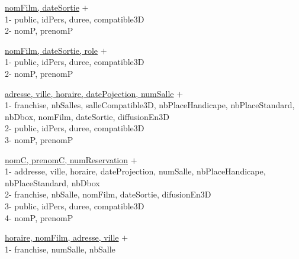 \documentclass[a4paper,sffamily,12pt]{article}
\begin{document}
\underline{nomFilm, dateSortie} $+$ \\
1- public, idPers, duree, compatible3D\\
2- nomP, prenomP\\

\vspace{0.5cm}

\underline{nomFilm, dateSortie, role} $+$ \\
1- public, idPers, duree, compatible3D\\
2- nomP, prenomP\\

\vspace{0.5cm}

\underline{adresse, ville, horaire, datePojection, numSalle} $+$ \\
1- franchise, nbSalles, salleCompatible3D, nbPlaceHandicape, nbPlaceStandard, nbDbox, nomFilm, dateSortie, diffusionEn3D\\
2- public, idPers, duree, compatible3D\\
3- nomP, prenomP\\

\vspace{0.5cm}

\underline{nomC, prenomC, numReservation} $+$ \\
1- addresse, ville, horaire, dateProjection, numSalle, nbPlaceHandicape, nbPlaceStandard, nbDbox\\
2- franchise, nbSalle, nomFilm, dateSortie, difusionEn3D\\
3- public, idPers, duree, compatible3D\\
4- nomP, prenomP\\
	
\vspace{0.5cm}

\underline{horaire, nomFilm, adresse, ville} $+$ \\
1- franchise, numSalle, nbSalle\\
\end{document}
